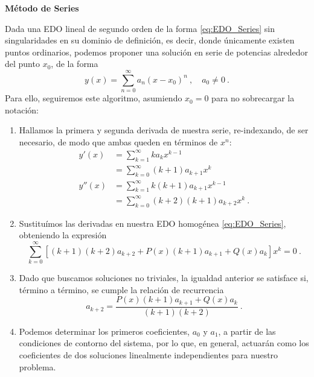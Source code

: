 \begin{propo} 
    \textbf{Método de Series}

    Dada una EDO lineal de segundo orden de la forma \eqref{eq:EDO_Series} sin singularidades en su dominio de definición, es decir, donde únicamente existen puntos ordinarios, podemos proponer una solución en serie de potencias alrededor del punto $x_0$, de la forma
    \begin{equation}
        y(x) = \sum_{n=0}^\infty a_n(x-x_0)^n \ , \quad a_0 \neq 0 \ .
    \end{equation}
    Para ello, seguiremos este algoritmo, asumiendo $x_0 = 0$ para no sobrecargar la notación:
    \begin{enumerate}
        \item Hallamos la primera y segunda derivada de nuestra serie, re-indexando, de ser necesario, de modo que ambas queden en términos de $x^n$:
        \begin{align}
            y'(x) & = \sum_{k=1}^\infty k a_k x^{k-1} \nonumber \\
            & = \sum_{k=0}^\infty (k+1) a_{k+1} x^{k} \\
            y''(x) & = \sum_{k=1}^\infty k (k+1) a_{k+1} x^{k-1} \nonumber \\
            & = \sum_{k=0}^\infty (k+2) (k+1) a_{k+2} x^{k} \ .
        \end{align}
        \item Sustituímos las derivadas en nuestra EDO homogénea \eqref{eq:EDO_Series}, obteniendo la expresión
        \begin{equation*}
            \sum_{k=0}^\infty [ (k+1)(k+2)a_{k+2} + P(x) (k+1)a_{k+1} + Q(x) a_k ] x^k = 0 \ .
        \end{equation*}
        \item Dado que buscamos soluciones no triviales, la igualdad anterior se satisface si, término a término, se cumple la relación de recurrencia
        \begin{equation}
            a_{k+2} = \frac{P(x) (k+1)a_{k+1} + Q(x) a_k}{(k+1)(k+2)} \ .
        \end{equation}
        \item Podemos determinar los primeros coeficientes, $a_0$ y $a_1$, a partir de las condiciones de contorno del sistema, por lo que, en general, actuarán como los coeficientes de dos soluciones linealmente independientes para nuestro problema.
    \end{enumerate}
\end{propo}

